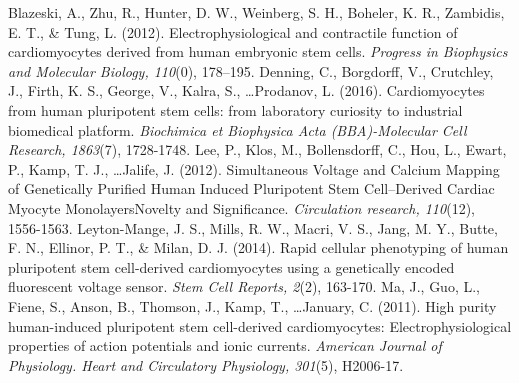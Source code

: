 \documentclass[12pt,a4paper]{article}
\begin{document}
\begin{thebibliography}{99}
 Blazeski, A., Zhu, R., Hunter, D. W., Weinberg, S. H., Boheler, K. R., Zambidis, E. T., \& Tung, L. (2012). Electrophysiological and contractile function of cardiomyocytes derived from human embryonic stem cells. \textit{Progress in Biophysics and Molecular Biology, 110}(0), 178–195.
 Denning, C., Borgdorff, V., Crutchley, J., Firth, K. S., George, V., Kalra, S., \ldots Prodanov, L. (2016). Cardiomyocytes from human pluripotent stem cells: from laboratory curiosity to industrial biomedical platform. \textit{Biochimica et Biophysica Acta (BBA)-Molecular Cell Research, 1863}(7), 1728-1748.
 Lee, P., Klos, M., Bollensdorff, C., Hou, L., Ewart, P., Kamp, T. J., \ldots Jalife, J. (2012). Simultaneous Voltage and Calcium Mapping of Genetically Purified Human Induced Pluripotent Stem Cell–Derived Cardiac Myocyte MonolayersNovelty and Significance. \textit{Circulation research, 110}(12), 1556-1563.
 Leyton-Mange, J. S., Mills, R. W., Macri, V. S., Jang, M. Y., Butte, F. N., Ellinor, P. T., \& Milan, D. J. (2014). Rapid cellular phenotyping of human pluripotent stem cell-derived cardiomyocytes using a genetically encoded fluorescent voltage sensor. \textit{Stem Cell Reports, 2}(2), 163-170.
 Ma, J., Guo, L., Fiene, S., Anson, B., Thomson, J., Kamp, T., \ldots January, C. (2011). High purity human-induced pluripotent stem cell-derived cardiomyocytes: Electrophysiological properties of action potentials and ionic currents. \textit{American Journal of Physiology. Heart and Circulatory Physiology, 301}(5), H2006-17.

\end{thebibliography}
\end{document}
